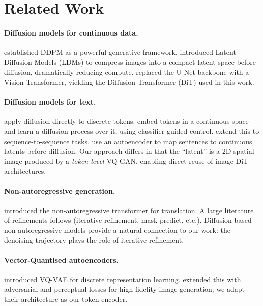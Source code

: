 \documentclass[11pt,a4paper]{article}
\begin{document}
\section{Related Work}
\label{sec:related}

\paragraph{Diffusion models for continuous data.}
\citet{ho2020ddpm} established DDPM as a powerful generative framework.
\citet{rombach2022ldm} introduced Latent Diffusion Models (LDMs) to compress images
into a compact latent space before diffusion, dramatically reducing compute.
\citet{peebles2023dit} replaced the U-Net backbone with a Vision Transformer,
yielding the Diffusion Transformer (DiT) used in this work.

\paragraph{Diffusion models for text.}
\citet{austin2021d3pm} apply diffusion directly to discrete tokens.
\citet{li2022diffusionlm} embed tokens in a continuous space and learn a diffusion
process over it, using classifier-guided control.
\citet{gong2023diffuseq} extend this to sequence-to-sequence tasks.
\citet{lovelace2023latent} use an autoencoder to map sentences to continuous latents
before diffusion.
Our approach differs in that the ``latent'' is a 2D spatial image produced by a
\emph{token-level} VQ-GAN, enabling direct reuse of image DiT architectures.

\paragraph{Non-autoregressive generation.}
\citet{gu2018nat} introduced the non-autoregressive transformer for translation.
A large literature of refinements follows (iterative refinement, mask-predict, etc.).
Diffusion-based non-autoregressive models \citep{gong2023diffuseq} provide a natural
connection to our work: the denoising trajectory plays the role of iterative refinement.

\paragraph{Vector-Quantised autoencoders.}
\citet{van2017vqvae} introduced VQ-VAE for discrete representation learning.
\citet{esser2021vqgan} extended this with adversarial and perceptual losses for
high-fidelity image generation; we adapt their architecture as our token encoder.
\end{document}
